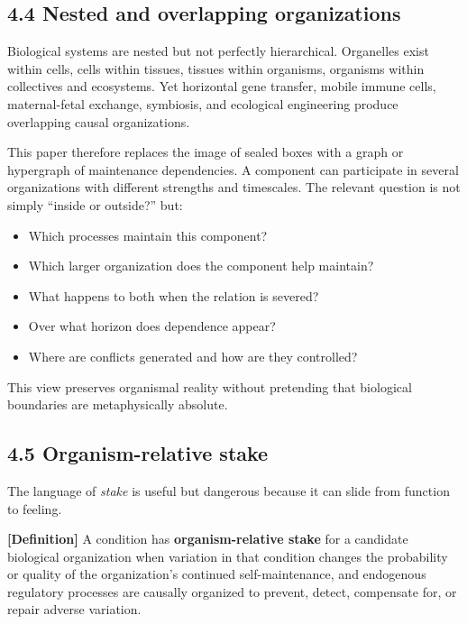 \documentclass[
  11pt,
]{article}
\providecommand{\tightlist}{%
  \setlength{\itemsep}{0pt}\setlength{\parskip}{0pt}}
\begin{document}
\subsection{4.4 Nested and overlapping
organizations}\label{nested-and-overlapping-organizations}

Biological systems are nested but not perfectly hierarchical. Organelles
exist within cells, cells within tissues, tissues within organisms,
organisms within collectives and ecosystems. Yet horizontal gene
transfer, mobile immune cells, maternal-fetal exchange, symbiosis, and
ecological engineering produce overlapping causal organizations.

This paper therefore replaces the image of sealed boxes with a graph or
hypergraph of maintenance dependencies. A component can participate in
several organizations with different strengths and timescales. The
relevant question is not simply ``inside or outside?'' but:

\begin{itemize}
\tightlist
\item
  Which processes maintain this component?
\item
  Which larger organization does the component help maintain?
\item
  What happens to both when the relation is severed?
\item
  Over what horizon does dependence appear?
\item
  Where are conflicts generated and how are they controlled?
\end{itemize}

This view preserves organismal reality without pretending that
biological boundaries are metaphysically absolute.

\subsection{4.5 Organism-relative stake}\label{organism-relative-stake}

The language of \emph{stake} is useful but dangerous because it can
slide from function to feeling.

\textbf{{[}Definition{]}} A condition has \textbf{organism-relative
stake} for a candidate biological organization when variation in that
condition changes the probability or quality of the organization's
continued self-maintenance, and endogenous regulatory processes are
causally organized to prevent, detect, compensate for, or repair adverse
variation.
\end{document}

